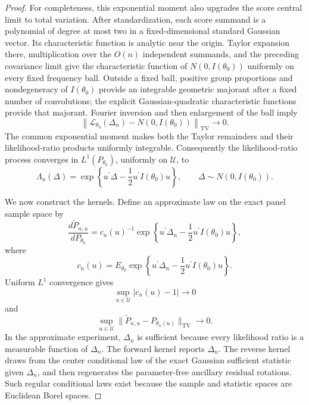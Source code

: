 \documentclass{article}
\begin{document}
\begin{proof}
For completeness, this exponential moment also upgrades the score central limit to total variation.  After standardization, each score summand is a polynomial of degree at most two in a fixed-dimensional standard Gaussian vector.  Its characteristic function is analytic near the origin.  Taylor expansion there, multiplication over the \(O(n)\) independent summands, and the preceding covariance limit give the characteristic function of \(N(0,I(\theta_0))\) uniformly on every fixed frequency ball.  Outside a fixed ball, positive group proportions and nondegeneracy of \(I(\theta_0)\) provide an integrable geometric majorant after a fixed number of convolutions; the explicit Gaussian-quadratic characteristic functions provide that majorant.  Fourier inversion and then enlargement of the ball imply
\[
\left\|
\mathcal L_{\theta_0}(\Delta_n)-N(0,I(\theta_0))
\right\|_{\mathrm{TV}}\longrightarrow0.
\]
The common exponential moment makes both the Taylor remainders and their likelihood-ratio products uniformly integrable.  Consequently the likelihood-ratio process converges in \(L^1(P_{\theta_0})\), uniformly on \(\mathcal U\), to
\[
\Lambda_u(\Delta)
=\exp\!\left\{
u^{\prime}\Delta-\frac12u^{\prime}I(\theta_0)u
\right\},
\qquad
\Delta\sim N(0,I(\theta_0)).
\]

We now construct the kernels.  Define an approximate law on the exact panel sample space by
\[
\frac{d\widetilde P_{n,u}}{dP_{\theta_0}}
=c_n(u)^{-1}
\exp\!\left\{
u^{\prime}\Delta_n-\frac12u^{\prime}I(\theta_0)u
\right\},
\]
where
\[
c_n(u)=E_{\theta_0}
\exp\!\left\{
u^{\prime}\Delta_n-\frac12u^{\prime}I(\theta_0)u
\right\}.
\]
Uniform \(L^1\) convergence gives
\[
\sup_{u\in\mathcal U}|c_n(u)-1|\longrightarrow0
\]
and
\[
\sup_{u\in\mathcal U}
\lVert\widetilde P_{n,u}-P_{\theta_n(u)}\rVert_{\mathrm{TV}}
\longrightarrow0.
\]
In the approximate experiment, \(\Delta_n\) is sufficient because every likelihood ratio is a measurable function of \(\Delta_n\).  The forward kernel reports \(\Delta_n\).  The reverse kernel draws from the center conditional law of the exact Gaussian sufficient statistic given \(\Delta_n\), and then regenerates the parameter-free ancillary residual rotations.  Such regular conditional laws exist because the sample and statistic spaces are Euclidean Borel spaces.


\end{proof}
\end{document}
